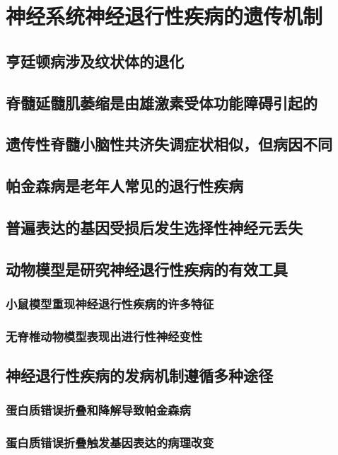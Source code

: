 \chapter{神经系统神经退行性疾病的遗传机制}

\section{亨廷顿病涉及纹状体的退化}

\section{脊髓延髓肌萎缩是由雄激素受体功能障碍引起的}

\section{遗传性脊髓小脑性共济失调症状相似，但病因不同}

\section{帕金森病是老年人常见的退行性疾病}

\section{普遍表达的基因受损后发生选择性神经元丢失}

\section{动物模型是研究神经退行性疾病的有效工具}
\subsection{小鼠模型重现神经退行性疾病的许多特征}
\subsection{无脊椎动物模型表现出进行性神经变性}

\section{神经退行性疾病的发病机制遵循多种途径}
\subsection{蛋白质错误折叠和降解导致帕金森病}
\subsection{蛋白质错误折叠触发基因表达的病理改变}
